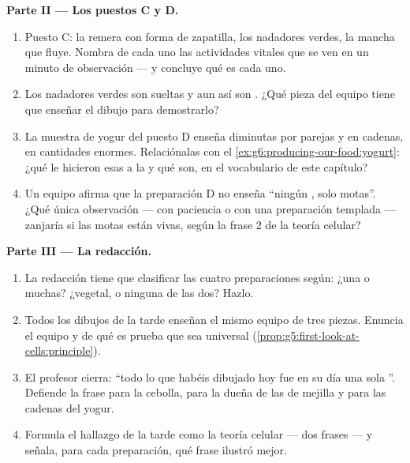 \begin{problem}
\medskip\noindent\textbf{Parte II --- Los puestos C y D.}
\begin{enumerate}[resume]
  \item Puesto C: la remera con forma de zapatilla, los nadadores
        verdes, la mancha que fluye. Nombra de cada uno las actividades
        vitales que se ven en un minuto de observación --- y concluye
        qué es cada uno.
  \item Los nadadores verdes son  sueltas y aun así son
        . ¿Qué pieza del equipo tiene que enseñar el dibujo
        para demostrarlo?
  \item La muestra de yogur del puesto D enseña  diminutas por
        parejas y en cadenas, en cantidades enormes. Relaciónalas con
        el \cref{ex:g6:producing-our-food:yogurt}: ¿qué le hicieron
        esas  a la  y qué son, en el vocabulario de este
        capítulo?
  \item Un equipo afirma que la preparación D no enseña ``ningún , solo motas''. ¿Qué única observación --- con paciencia o
        con una preparación templada --- zanjaría si las motas están
        vivas, según la frase 2 de la teoría celular?
\end{enumerate}

\medskip\noindent\textbf{Parte III --- La redacción.}
\begin{enumerate}[resume]
  \item La redacción tiene que clasificar las cuatro preparaciones
        según: ¿una  o muchas? ¿vegetal,  o ninguna de las
        dos? Hazlo.
  \item Todos los dibujos de la tarde enseñan el mismo equipo de tres
        piezas. Enuncia el equipo y de qué es prueba que sea universal
        (\cref{prop:g5:first-look-at-cells:principle}).
  \item El profesor cierra: ``todo lo que habéis dibujado hoy fue en su
        día una sola ''. Defiende la frase para la cebolla, para
        la dueña de las  de mejilla y para las cadenas del yogur.
  \item Formula el hallazgo de la tarde como la teoría celular --- dos
        frases --- y señala, para cada preparación, qué frase ilustró
        mejor.
\end{enumerate}
\end{problem}
